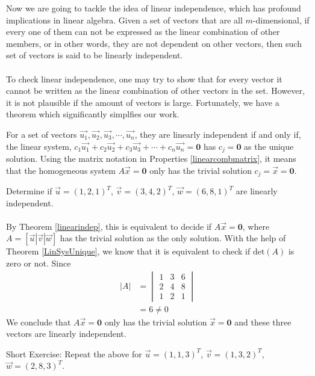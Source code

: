 Now we are going to tackle the idea of linear independence, which has profound implications in linear algebra. Given a set of vectors that are all $m$-dimensional, if every one of them can not be expressed as the linear combination of other members, or in other words, they are not dependent on other vectors, then such set of vectors is said to be linearly independent. \\
\\
To check linear independence, one may try to show that for every vector it cannot be written as the linear combination of other vectors in the set. However, it is not plausible if the amount of vectors is large. Fortunately, we have a theorem which significantly simplfies our work.
\begin{thm}
\label{linearindep}
For a set of vectors $\vec{u_1}, \vec{u_2}, \vec{u_3}, \cdots, \vec{u_n}$, they are linearly independent if and only if, the linear system, $c_1\vec{u_1} + c_2\vec{u_2} + c_3\vec{u_3} + \cdots + c_n\vec{u_n} = \textbf{0}$ has $c_j = \textbf{0}$ as the unique solution. Using the matrix notation in Properties \ref{linearcombmatrix}, it means that the homogeneous system $A\vec{x} = \textbf{0}$ only has the trivial solution $c_j = \vec{x} = \textbf{0}$.
\end{thm}
\begin{exmp}
\label{exmplinearindep}
Determine if $\vec{u} = (1,2,1)^T$, $\vec{v} = (3,4,2)^T$, $\vec{w} = (6,8,1)^T$ are linearly independent.\\
\\
By Theorem \ref{linearindep}, this is equivalent to decide if $A\vec{x} = \textbf{0}$, where $A = [\vec{u}|\vec{v}|\vec{w}]$ has the trivial solution as the only solution. With the help of Theorem \ref{LinSysUnique}, we know that it is equivalent to check if $\text{det}(A)$ is zero or not. Since
\begin{align*}
|A| &=
\begin{vmatrix}
1 & 3 & 6\\
2 & 4 & 8 \\
1 & 2 & 1
\end{vmatrix} \\
&= 6 \neq 0
\end{align*}
We conclude that $A\vec{x} = \textbf{0}$ only has the trivial solution $\vec{x} = \textbf{0}$ and these three vectors are linearly independent.
\end{exmp}
Short Exercise: Repeat the above for $\vec{u} = (1,1,3)^T$, $\vec{v} = (1,3,2)^T$, $\vec{w} = (2,8,3)^T$.\\
